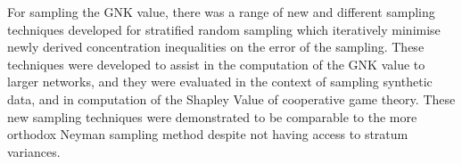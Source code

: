 For sampling the GNK value, there was a range of new and different sampling techniques developed for stratified random sampling which iteratively minimise newly derived concentration inequalities on the error of the sampling.
These techniques were developed to assist in the computation of the GNK value to larger networks, and they were evaluated in the context of sampling synthetic data, and in computation of the Shapley Value of cooperative game theory.
These new sampling techniques were demonstrated to be comparable to the more orthodox Neyman sampling method despite not having access to stratum variances.



